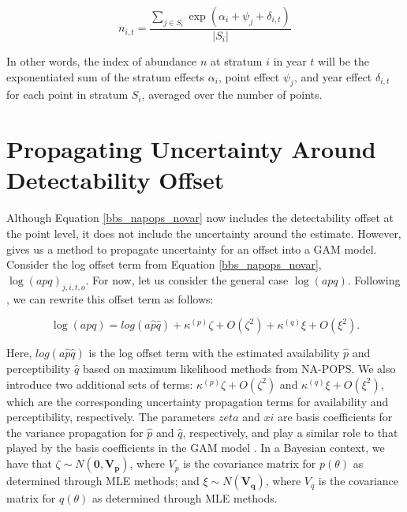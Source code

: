 \documentclass[12pt]{article}
\begin{document}
$$
n_{i,t} = \dfrac{\sum_{j\in S_i}\exp(\alpha_i + \psi_j + \delta_{i,t})}{|S_i|}
$$

In other words, the index of abundance $n$ at stratum $i$ in year $t$ will be the exponentiated sum of the stratum effects $\alpha_i$, point effect $\psi_j$, and year effect $\delta_{i,t}$ for each point in stratum $S_i$, averaged over the number of points.

\section{Propagating Uncertainty Around Detectability Offset}
Although Equation \ref{bbs_napops_novar} now includes the detectability offset at the point level, it does not include the uncertainty around the estimate. However, \citet{bravington_variance_2021} gives us a method to propagate uncertainty for an offset into a GAM model. Consider the log offset term from Equation \ref{bbs_napops_novar}, $\log(apq)_{j,i,t,o}$. For now, let us consider the general case $\log(apq)$. Following \citet{bravington_variance_2021}, we can rewrite this offset term as follows:

\begin{equation}\label{offset}
	\log(apq) = log(a\hat{p} \hat{q}) + \kappa^{(p)}\zeta + O(\zeta^2) + \kappa^{(q)}\xi + O(\xi^2).
\end{equation}
	 
\par Here, $log(a \hat{p} \hat{q})$ is the log offset term with the estimated availability $\hat{p}$ and perceptibility $\hat{q}$ based on maximum likelihood methods from NA-POPS. We also introduce two additional sets of terms: $\kappa^{(p)}\zeta + O(\zeta^2)$ and $\kappa^{(q)}\xi + O(\xi^2)$, which are the corresponding uncertainty propagation terms for availability and perceptibility, respectively.  The parameters $zeta$ and $xi$ are basis coefficients for the variance propagation for $\hat{p}$ and $\hat{q}$, respectively, and play a similar role to that played by the basis coefficients in the GAM model \citep{bravington_variance_2021}. In a Bayesian context, we have that $\zeta \sim N(\boldsymbol{0}, \boldsymbol{V_p})$, where $V_p$ is the covariance matrix for $p(\theta)$ as determined through MLE methods; and $\xi \sim N(\boldsymbol{V_q})$, where $V_q$ is the covariance matrix for $q(\theta)$ as determined through MLE methods.
\end{document}
